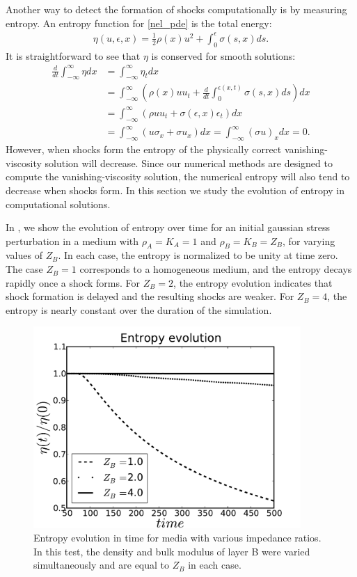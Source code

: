 Another way to detect the formation of shocks computationally is by
measuring entropy.  An entropy function for \eqref{nel_pde} is the total energy:
\begin{align}
  \eta(u,\epsilon,x) = \frac{1}{2}\rho(x)u^2 + \int_0^\epsilon \sigma(s,x)ds.
\end{align}
It is straightforward to see that $\eta$ is conserved for smooth solutions:
\begin{align*}
  \frac{d}{dt} \int_{-\infty}^\infty \eta dx & = \int_{-\infty}^\infty \eta_t dx \\
    & = \int_{-\infty}^\infty \left(\rho(x) u u_t + \frac{d}{dt}\int_0^{\epsilon(x,t)} \sigma(s,x) ds \right) dx \\
    & = \int_{-\infty}^\infty \left(\rho u u_t + \sigma(\epsilon,x)\epsilon_t\right) dx \\
    & = \int_{-\infty}^\infty \left(u\sigma_x + \sigma u_x\right) dx = \int_{-\infty}^\infty (\sigma u)_x dx = 0.
\end{align*}
However, when shocks form the entropy of the physically correct
vanishing-viscosity solution will decrease.  Since our numerical
methods are designed to compute the vanishing-viscosity solution,
the numerical entropy will also tend to decrease when shocks form.
In this section we study the evolution of entropy in computational solutions.

In , we show the evolution of entropy over time for 
an initial gaussian stress perturbation
in a medium with $\rho_A=K_A=1$ and $\rho_B=K_B=Z_B$, for
varying values of $Z_B$.  In each case, the entropy is normalized to be
unity at time zero.  The case $Z_B=1$ corresponds to a homogeneous
medium, and the entropy decays rapidly once a shock forms.  
For $Z_B=2$, the entropy evolution indicates that shock formation is
delayed and the resulting shocks are weaker.
For $Z_B=4$, the entropy is nearly constant over the duration
of the simulation.

\begin{figure}
\centerline{
\includegraphics[width=4in]{figures/entropy.pdf}}
\caption{Entropy evolution in time for media with various impedance
ratios.  In this test, the density and bulk modulus of layer B were 
varied simultaneously and are equal to $Z_B$ in each case.\label{fig:entropy_1}}
\end{figure}


